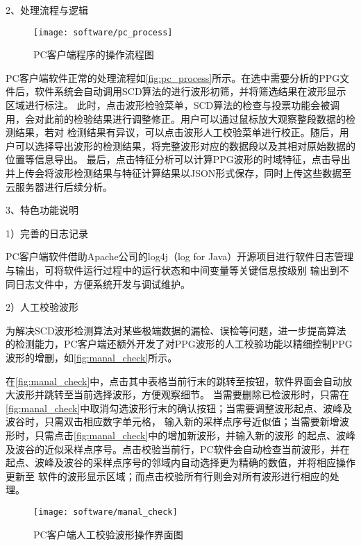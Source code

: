 2、处理流程与逻辑

\begin{figure}[htbp]
    \centering
    \texttt{[image: software/pc\_process]}
    \caption{\label{fig:pc_process}PC客户端程序的操作流程图}
\end{figure}

PC客户端软件正常的处理流程如\autoref{fig:pc_process}所示。在选中需要分析的PPG文件后，软件系统会自动调用SCD算法的进行波形初筛，并将筛选结果在波形显示区域进行标注。
此时，点击波形检验菜单，SCD算法的检查与投票功能会被调用，会对此前的检验结果进行调整修正。用户可以通过鼠标放大观察整段数据的检测结果，若对
检测结果有异议，可以点击波形人工校验菜单进行校正。随后，用户可以选择导出波形的检测结果，将完整波形对应的数据段以及其相对原始数据的位置等信息导出。
最后，点击特征分析可以计算PPG波形的时域特征，点击导出并上传会将波形检测结果与特征计算结果以JSON形式保存，同时上传这些数据至云服务器进行后续分析。

3、特色功能说明

1）完善的日志记录

PC客户端软件借助Apache公司的log4j（log for Java）开源项目\cite{log4j}进行软件日志管理与输出，可将软件运行过程中的运行状态和中间变量等关键信息按级别
输出到不同日志文件中，方便系统开发与调试维护。%

2）人工校验波形

为解决SCD波形检测算法对某些极端数据的漏检、误检等问题，进一步提高算法的检测能力，PC客户端还额外开发了对PPG波形的人工校验功能以精细控制PPG波形的增删，如\autoref{fig:manal_check}所示。

在\autoref{fig:manal_check}中，点击其中表格当前行末的跳转至按钮，软件界面会自动放大波形并跳转至当前选择波形，方便观察细节。
当需要删除已检波形时，只需在\autoref{fig:manal_check}中取消勾选波形行末的确认按钮；当需要调整波形起点、波峰及波谷时，只需双击相应数字单元格，
输入新的采样点序号近似值；当需要新增波形时，只需点击\autoref{fig:manal_check}中的增加新波形，并输入新的波形
的起点、波峰及波谷的近似采样点序号。点击校验当前行，PC软件会自动检查当前波形，并在起点、波峰及波谷的采样点序号的邻域内自动选择更为精确的数值，并将相应操作更新至
软件的波形显示区域；而点击校验所有行则会对所有波形进行相应的处理。
\begin{figure}[htbp]
    \centering
    \texttt{[image: software/manal\_check]}
    \caption{\label{fig:manal_check}PC客户端人工校验波形操作界面图}
\end{figure}

